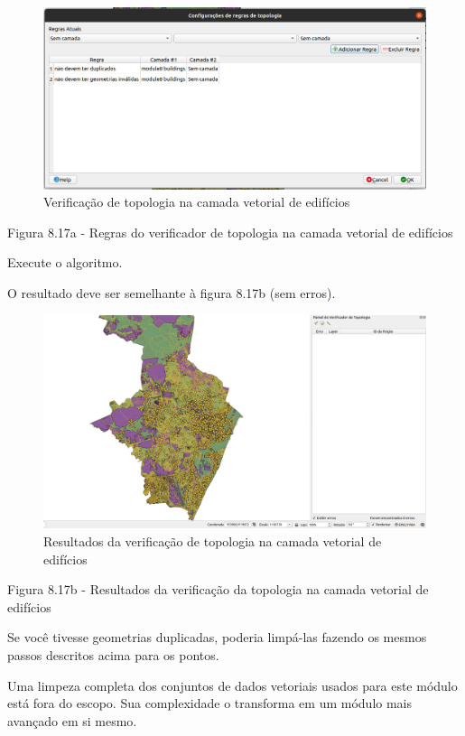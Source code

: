 \documentclass[
]{book}
\begin{document}
\begin{figure}
\centering
\includegraphics{media/modulo8/fig817_a.png}
\caption{Verificação de topologia na camada vetorial de edifícios}
\end{figure}

Figura 8.17a - Regras do verificador de topologia na camada vetorial de edifícios

Execute o algoritmo.

O resultado deve ser semelhante à figura 8.17b (sem erros).

\begin{figure}
\centering
\includegraphics{media/modulo8/fig817_b.png}
\caption{Resultados da verificação de topologia na camada vetorial de edifícios}
\end{figure}

Figura 8.17b - Resultados da verificação da topologia na camada vetorial de edifícios

Se você tivesse geometrias duplicadas, poderia limpá-las fazendo os mesmos passos descritos acima para os pontos.

Uma limpeza completa dos conjuntos de dados vetoriais usados \hspace{0pt}\hspace{0pt}para este módulo está fora do escopo. Sua complexidade o transforma em um módulo mais avançado em si mesmo.
\end{document}
